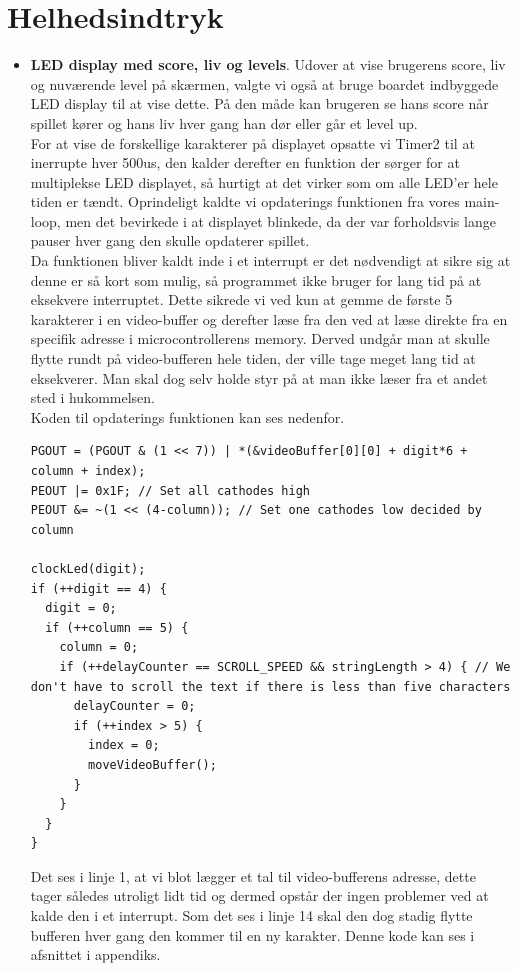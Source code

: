 		

\section{Helhedsindtryk}

\begin{itemize}
\item \textbf{LED display med score, liv og levels}. Udover at vise brugerens score, liv og nuværende level på skærmen, valgte vi også at bruge boardet indbyggede LED display til at vise dette. På den måde kan brugeren se hans score når spillet kører og hans liv hver gang han dør eller går et level up. \\
For at vise de forskellige karakterer på displayet opsatte vi Timer2 til at inerrupte hver 500us, den kalder derefter en funktion der sørger for at  multiplekse LED displayet, så hurtigt at det virker som om alle LED'er hele tiden er tændt. Oprindeligt kaldte vi opdaterings funktionen fra vores main-loop, men det bevirkede i at displayet blinkede, da der var forholdsvis lange pauser hver gang den skulle opdaterer spillet. \\
Da funktionen bliver kaldt inde i et interrupt er det nødvendigt at sikre sig at denne er så kort som mulig, så programmet ikke bruger for lang tid på at eksekvere interruptet. Dette sikrede vi ved kun at gemme de første 5 karakterer i en video-buffer og derefter læse fra den ved at læse direkte fra en specifik adresse i microcontrollerens memory. Derved undgår man at skulle flytte rundt på video-bufferen hele tiden, der ville tage meget lang tid at eksekverer. Man skal dog selv holde styr på at man ikke læser fra et andet sted i hukommelsen. \\
Koden til opdaterings funktionen kan ses nedenfor.

\begin{lstlisting}[frame=single]
PGOUT = (PGOUT & (1 << 7)) | *(&videoBuffer[0][0] + digit*6 + column + index);
PEOUT |= 0x1F; // Set all cathodes high
PEOUT &= ~(1 << (4-column)); // Set one cathodes low decided by column

clockLed(digit);
if (++digit == 4) {
  digit = 0;
  if (++column == 5) {
    column = 0;
	if (++delayCounter == SCROLL_SPEED && stringLength > 4) { // We don't have to scroll the text if there is less than five characters
	  delayCounter = 0;				
	  if (++index > 5) {
        index = 0;
		moveVideoBuffer();
	  }
	}
  }
}
\end{lstlisting}

Det ses i linje 1, at vi blot lægger et tal til video-bufferens adresse, dette tager således utroligt lidt tid og dermed opstår der ingen problemer ved at kalde den i et interrupt. Som det ses i linje 14 skal den dog stadig flytte bufferen hver gang den kommer til en ny karakter. Denne kode kan ses i afsnittet  i appendiks.


\end{itemize}
